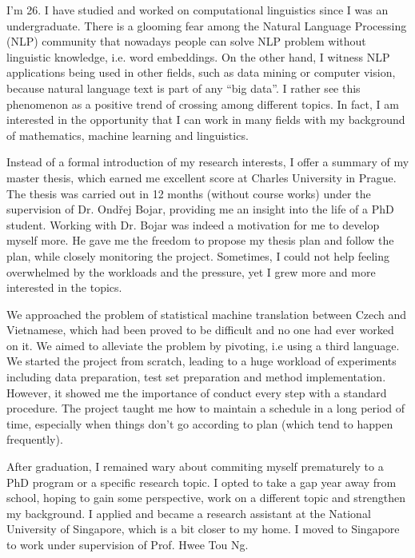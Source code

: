 \documentclass[a4paper, 12pt]{scrartcl}
\begin{document}

I'm 26. I have studied and worked on computational linguistics since I was an undergraduate. 
There is a glooming fear among the Natural Language Processing (NLP) community that nowadays people can solve NLP problem without linguistic knowledge, i.e. word embeddings.
On the other hand, I witness NLP applications being used in other fields, such as data mining or computer vision, because natural language text is part of any ``big data''. 
I rather see this phenomenon as a positive trend of crossing among different topics. 
In fact, I am interested in the opportunity that I can work in many fields with my background of mathematics, machine learning and linguistics. 


Instead of a formal introduction of my research interests, I offer a summary of my master thesis, which earned me excellent score at Charles University in Prague. 
The thesis was carried out in 12 months (without course works) under the supervision of Dr. Ond{\v r}ej Bojar, providing me an insight into the life of a PhD student.
Working with Dr. Bojar was indeed a motivation for me to develop myself more. 
He gave me the freedom to propose my thesis plan and follow the plan, while closely monitoring the project.
Sometimes, I could not help feeling overwhelmed by the workloads and the pressure, yet I grew more and more interested in the topics.

We approached the problem of statistical machine translation between Czech and Vietnamese, which had been proved to be difficult and no one had ever worked on it.
We aimed to alleviate the problem by pivoting, i.e using a third language. 
We started the project from scratch, leading to a huge workload of experiments including data preparation, test set preparation and method implementation. 
However, it showed me the importance of conduct every step with a standard procedure.
The project taught me how to maintain a schedule in a long period of time, especially when things don't go according to plan (which tend to happen frequently).


After graduation, I remained wary about commiting myself prematurely to a PhD program or a specific research topic. 
I opted to take a gap year away from school, hoping to gain some perspective, work on a different topic and strengthen my background.
I applied and became a research assistant at the National University of Singapore, which is a bit closer to my home.
I moved to Singapore to work under supervision of Prof. Hwee Tou Ng.  
\end{document}
